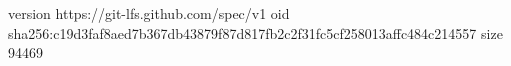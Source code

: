 version https://git-lfs.github.com/spec/v1
oid sha256:c19d3faf8aed7b367db43879f87d817fb2c2f31fc5cf258013affc484c214557
size 94469
